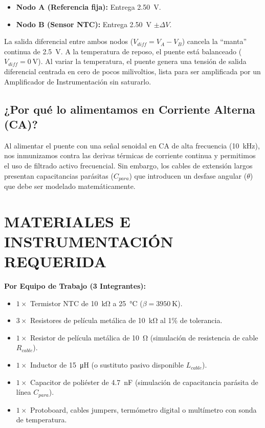 \documentclass[11pt,a4paper]{article}
\begin{document}
\begin{itemize}
    \item \textbf{Nodo A (Referencia fija):} Entrega \qty{2.50}{\volt}.
    \item \textbf{Nodo B (Sensor NTC):} Entrega \qty{2.50}{\volt} $\pm \Delta V$.
\end{itemize}
La salida diferencial entre ambos nodos ($V_{diff} = V_A - V_B$) cancela la ``manta'' continua de \qty{2.5}{\volt}. A la temperatura de reposo, el puente está balanceado ($V_{diff} = \qty{0}{\volt}$). Al variar la temperatura, el puente genera una tensión de salida diferencial centrada en cero de pocos milivoltios, lista para ser amplificada por un Amplificador de Instrumentación sin saturarlo.

\subsection*{¿Por qué lo alimentamos en Corriente Alterna (CA)?}
Al alimentar el puente con una señal senoidal en CA de alta frecuencia (\qty{10}{\kilo\hertz}), nos inmunizamos contra las derivas térmicas de corriente continua y permitimos el uso de filtrado activo frecuencial. Sin embargo, los cables de extensión largos presentan capacitancias parásitas ($C_{para}$) que introducen un desfase angular ($\theta$) que debe ser modelado matemáticamente.

\section{MATERIALES E INSTRUMENTACIÓN REQUERIDA}

\noindent\textbf{Por Equipo de Trabajo (3 Integrantes):}
\begin{itemize}[label=$\circ$, itemsep=0pt]
    \item $1 \times$ Termistor NTC de \qty{10}{\kilo\ohm} a \qty{25}{\celsius} ($\beta = \qty{3950}{\kelvin}$).
    \item $3 \times$ Resistores de película metálica de \qty{10}{\kilo\ohm} al 1\% de tolerancia.
    \item $1 \times$ Resistor de película metálica de \qty{10}{\ohm} (simulación de resistencia de cable $R_{cable}$).
    \item $1 \times$ Inductor de \qty{15}{\micro\henry} (o sustituto pasivo disponible $L_{cable}$).
    \item $1 \times$ Capacitor de poliéster de \qty{4.7}{\nano\farad} (simulación de capacitancia parásita de línea $C_{para}$).
    \item $1 \times$ Protoboard, cables jumpers, termómetro digital o multímetro con sonda de temperatura.
\end{itemize}
\end{document}
